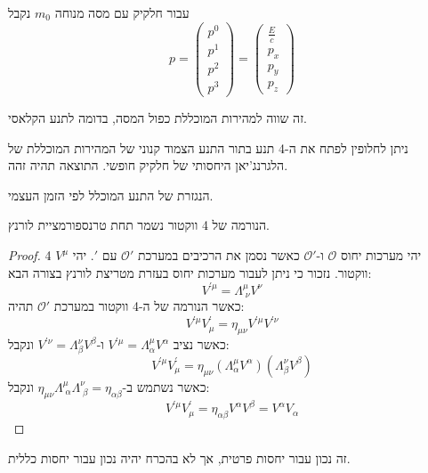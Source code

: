 \documentclass{tstextbook}
\begin{document}
\begin{definition}[4 תנע]
עבור חלקיק עם מסה מנוחה \(m_{0}\) נקבל
$$p=\begin{pmatrix}p^0\\p^1\\p^2\\p^3\end{pmatrix}=\begin{pmatrix}\frac{E}{c}  \\p_{x} \\p_{y} \\p_{z}
\end{pmatrix}$$

\end{definition}
\begin{proposition}
זה שווה למהירות המוכללת כפול המסה, בדומה לתנע הקלאסי. 

\end{proposition}
\begin{remark}
ניתן לחלופין לפתח את ה-4 תנע בתור התנע הצמוד קנוני של המהירות המוכללת של הלגרנג'יאן היחסותי של חלקיק חופשי. התוצאה תהיה זהה.

\end{remark}
\begin{definition}[4-כוח]
הנגזרת של התנע המוכלל לפי הזמן העצמי.

\end{definition}
\begin{proposition}
הנורמה של 4 ווקטור נשמר תחת טרנספורמציית לורנץ.

\end{proposition}
\begin{proof}
יהי מערכות יחוס \(\mathcal{O}\) ו-\(\mathcal{O}'\) כאשר נסמן את הרכיבים במערכת \(\mathcal{O'}\) עם \(\prime\). יהי \(V^\mu\) 4 ווקטור. נזכור כי ניתן לעבור מערכות יחוס בעזרת מטריצת לורנץ בצורה הבא:
$$V^{\prime\mu}=\Lambda_{\;\nu}^{\mu}V^{\nu}$$
כאשר הנורמה של ה-4 ווקטור במערכת \(\mathcal{O'}\) תהיה:
$$V^{\prime\mu}V_{\mu}^{\prime}=\eta_{\mu\nu}V^{\prime\mu}V^{\prime\nu}$$
כאשר נציב  \(V^{\prime\mu}=\Lambda_{\alpha}^{\mu}V^{\alpha}\) ו-\(V^{\prime\nu}=\Lambda_{\beta}^{\nu}V^{\beta}\) ונקבל:
$$V^{\prime\mu}V_{\mu}^{\prime}=\eta_{\mu\nu}(\Lambda_{\alpha}^{\mu}V^{\alpha})(\Lambda_{\beta}^{\nu}V^{\beta})$$
כאשר נשתמש ב-\(\eta_{\mu\nu}\Lambda_{\;\alpha}^{\mu}\Lambda_{\;\beta}^{\nu}=\eta_{\alpha\beta}\) ונקבל:
$$V^{\prime\mu}V_{\mu}^{\prime}=\eta_{\alpha\beta}V^{\alpha}V^{\beta}= V^\alpha V_{\alpha}$$

\end{proof}
\begin{remark}
זה נכון עבור יחסות פרטית, אך לא בהכרח יהיה נכון עבור יחסות כללית.

\end{remark}
\end{document}
